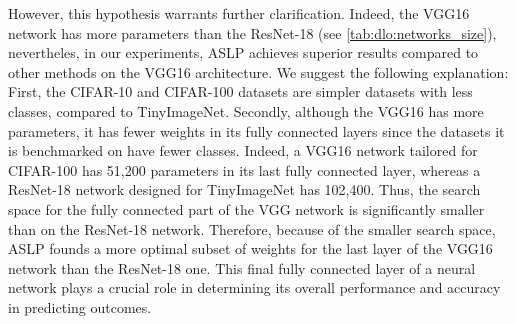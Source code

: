 However, this hypothesis warrants further clarification. Indeed, the VGG16
network has more parameters than the ResNet-18 (see
\cref{tab:dlo:networks_size}), nevertheles, in our experiments, \ac{ASLP}
achieves superior results compared to other methods on the VGG16 architecture.
We suggest the following explanation: First, the CIFAR-10 and CIFAR-100 datasets
are simpler datasets with less classes, compared to TinyImageNet. Secondly,
although the VGG16 has more parameters, it has fewer weights in its fully
connected layers since the datasets it is benchmarked on have fewer classes.
Indeed, a VGG16 network tailored for CIFAR-100 has 51,200 parameters in its last
fully connected layer, whereas a ResNet-18 network designed for TinyImageNet has
102,400. Thus, the search space for the fully connected part of the VGG network
is significantly smaller than on the ResNet-18 network. Therefore, because of
the smaller search space, \ac{ASLP} founds a more optimal subset of weights for
the last layer of the VGG16 network than the ResNet-18 one. This final fully
connected layer of a neural network plays a crucial role in determining its
overall performance and accuracy in predicting outcomes.\\







